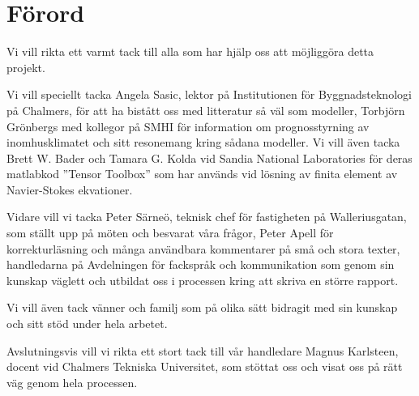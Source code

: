 \chapter*{Förord}


Vi vill rikta ett varmt tack till alla som har hjälp oss att möjliggöra detta projekt. 

Vi vill speciellt tacka Angela Sasic, lektor på Institutionen för Byggnadsteknologi på Chalmers, för att ha bistått oss med litteratur så väl som modeller, Torbjörn Grönbergs med kollegor på SMHI för information om prognosstyrning av inomhusklimatet och sitt resonemang kring sådana modeller. Vi vill även tacka Brett W. Bader och Tamara G. Kolda vid Sandia National Laboratories för deras matlabkod ''Tensor Toolbox'' som har används vid lösning av finita element av Navier-Stokes ekvationer.

Vidare vill vi tacka Peter Särneö, teknisk chef för fastigheten på Walleriusgatan, som ställt upp på möten och besvarat våra frågor, Peter Apell för korrekturläsning och många användbara kommentarer på små och stora texter, handledarna på Avdelningen för fackspråk och kommunikation som genom sin kunskap väglett och utbildat oss i processen kring att skriva en större rapport.

Vi vill även tack vänner och familj som på olika sätt bidragit med sin kunskap och sitt stöd under hela arbetet.

Avslutningsvis vill vi rikta ett stort tack till vår handledare Magnus Karlsteen, docent vid Chalmers Tekniska Universitet, som stöttat oss och visat oss på rätt väg genom hela processen.

